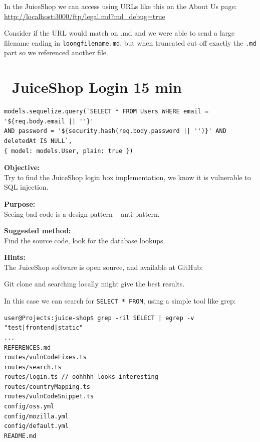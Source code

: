 \documentclass[a4paper,11pt,notitlepage]{report}
\begin{document}
In the JuiceShop we can access using URLs like this on the About Us page:\\
\url{http://localhost:3000/ftp/legal.md?md_debug=true}

Consider if the URL would match on .md and we were able to send a large filename ending in \verb+loongfilename.md+, but when truncated cut off exactly the \verb+.md+ part so we referenced another file.



\chapter{\faExclamationTriangle\ JuiceShop Login 15 min}
\label{ex:juice-shop-login}

\begin{verbatim}
models.sequelize.query(`SELECT * FROM Users WHERE email = '${req.body.email || ''}'
AND password = '${security.hash(req.body.password || '')}' AND deletedAt IS NULL`,
{ model: models.User, plain: true })
\end{verbatim}

{\bf Objective:}\\
Try to find the JuiceShop login box implementation, we know it is vulnerable to SQL injection.


{\bf Purpose:}\\
Seeing bad code is a design pattern -- anti-pattern.


{\bf Suggested method:}\\
Find the source code, look for the database lookups.


{\bf Hints:}\\
The JuiceShop software is open source, and available at GitHub:\\

Git clone and searching locally might give the best results.

In this case we can search for \verb+SELECT * FROM+, using a simple tool like grep:

\begin{verbatim}
user@Projects:juice-shop$ grep -ril SELECT | egrep -v "test|frontend|static"
...
REFERENCES.md
routes/vulnCodeFixes.ts
routes/search.ts
routes/login.ts // oohhhh looks interesting
routes/countryMapping.ts
routes/vulnCodeSnippet.ts
config/oss.yml
config/mozilla.yml
config/default.yml
README.md
\end{verbatim}
\end{document}
